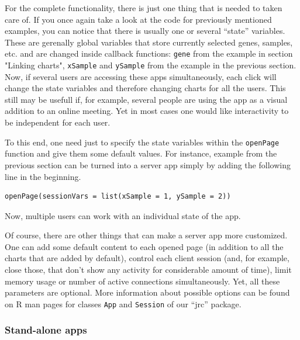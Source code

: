 \documentclass[twocolumn,10pt]{article}
\begin{document}
For the complete functionality, there is just one thing that is needed to taken care of. If you once again take a look at the code for previously mentioned examples, you can notice that there is usually one or several ``state'' variables. These are gerenally global variables that store currently selected genes, samples, etc. and are changed inside callback functions: \texttt{gene} from the example in section "Linking charts", \texttt{xSample} and \texttt{ySample} from the example in the previous section. Now, if several users are accessing these apps simultaneously, each click will change the state variables and therefore changing charts for all the users. This still may be usefull if, for example, several people are using the app as a visual addition to an online meeting. Yet in most cases one would like interactivity to be independent for each user.

To this end, one need just to specify the state variables within the \texttt{openPage} function and give them some default values. For instance, example from the previous section can be turned into a server app simply by adding the following line in the beginning.

\begin{verbatim}
openPage(sessionVars = list(xSample = 1, ySample = 2))
\end{verbatim}

Now, multiple users can work with an individual state of the app.

Of course, there are other things that can make a server app more customized. One can add some default content to each opened page (in addition to all the charts that are added by default), control each client session (and, for example, close those, that don't show any activity for considerable amount of time), limit memory usage or number of active connections simultaneously. Yet, all these parameters are optional. More information about possible options can be found on R man pages for classes \texttt{App} and \texttt{Session} of our ``jrc'' package.

\subsubsection{Stand-alone apps}
\end{document}
